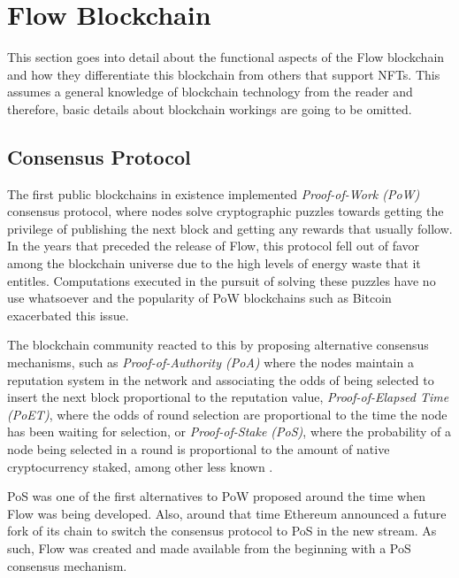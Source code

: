 \documentclass[../access.tex]{subfiles}
\begin{document}
\section{Flow Blockchain}
\label{sec:flow_blockchain}
This section goes into detail about the functional aspects of the Flow blockchain and how they differentiate this blockchain from others that support NFTs. This assumes a general knowledge of blockchain technology from the reader and therefore, basic details about blockchain workings are going to be omitted.
\par
\subsection{Consensus Protocol}
The first public blockchains in existence implemented \textit{Proof-of-Work (PoW)} consensus protocol, where nodes solve cryptographic puzzles towards getting the privilege of publishing the next block and getting any rewards that usually follow. In the years that preceded the release of Flow, this protocol fell out of favor among the blockchain universe due to the high levels of energy waste that it entitles. Computations executed in the pursuit of solving these puzzles have no use whatsoever and the popularity of PoW blockchains such as Bitcoin exacerbated this issue.
\par
The blockchain community reacted to this by proposing alternative consensus mechanisms, such as \textit{Proof-of-Authority (PoA)} where the nodes maintain a reputation system in the network and associating the odds of being selected to insert the next block proportional to the reputation value, \textit{Proof-of-Elapsed Time (PoET)}, where the odds of round selection are proportional to the time the node has been waiting for selection, or \textit{Proof-of-Stake (PoS)}, where the probability of a node being selected in a round is proportional to the amount of native cryptocurrency staked, among other less known \cite{Bouraga2021}.
\par
PoS was one of the first alternatives to PoW proposed around the time when Flow was being developed. Also, around that time Ethereum announced a future fork of its chain to switch the consensus protocol to PoS in the new stream. As such, Flow was created and made available from the beginning with a PoS consensus mechanism.
\end{document}
